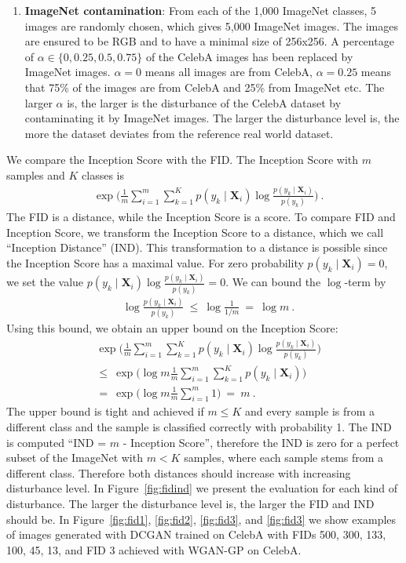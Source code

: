 \documentclass{article}
\newcommand\BX{\bm{X}}
\renewcommand{\leq}{\leqslant}
\begin{document}
\begin{enumerate}
\item {\bf ImageNet contamination}: From each of the 1,000 ImageNet classes,
5 images are randomly chosen, which gives 5,000 ImageNet images.
The images are ensured to be RGB and to have a minimal size of 256x256.
A percentage of $\alpha \in \{0,0.25,0.5,0.75\}$ of the
CelebA images has been replaced by ImageNet images.
$\alpha =0$ means all images are from CelebA, $\alpha=0.25$ means that
75\% of the images are from CelebA and 25\% from ImageNet etc.
The larger $\alpha$ is, the larger is the disturbance of the CelebA dataset
by contaminating it by ImageNet images.
The larger the disturbance level is, the more the dataset
deviates from the reference real world dataset.
\end{enumerate}


We compare the Inception Score \cite{Salimans:16} with the FID.
The Inception Score with $m$ samples and $K$ classes is
\begin{align}
&\exp \big( \frac{1}{m} \sum_{i=1}^{m} \sum_{k=1}^{K} p(y_k\mid \BX_i)
  \log \frac{p(y_k\mid \BX_i)}{p(y_k)} \big) \ .
\end{align}
The FID is a distance, while the Inception Score is a score.
To compare FID and Inception Score,
we transform the Inception Score to a distance,
which we call ``Inception Distance'' (IND).
This transformation to a distance
is possible since the Inception Score has a
maximal value.
For zero probability $p(y_k\mid \BX_i)=0$,
we set the value $p(y_k\mid \BX_i)
  \log \frac{p(y_k\mid \BX_i)}{p(y_k)}=0$.
We can bound the $\log$-term by
\begin{align}
&\log \frac{p(y_k\mid \BX_i)}{p(y_k)} \ \leq \  \log \frac{1}{1/m} \
  = \ \log m \ .
\end{align}
Using this bound, we obtain an upper bound on the Inception Score:
\begin{align}
&\exp \big( \frac{1}{m} \sum_{i=1}^{m} \sum_{k=1}^{K} p(y_k\mid \BX_i)
  \log \frac{p(y_k\mid \BX_i)}{p(y_k)} \big) \\
&\leq \ \exp \big( \log m \frac{1}{m} \sum_{i=1}^{m} \sum_{k=1}^{K} p(y_k\mid \BX_i) \big) \\
&= \ \exp \big( \log m \frac{1}{m} \sum_{i=1}^{m} 1 \big) \ = \ m \ .
\end{align}
The upper bound is tight and achieved if $m \leq K$ and every sample is from a
different class and the sample is classified correctly with
probability 1.
The IND is computed ``IND = $m$ - Inception Score'', therefore the IND is
zero for a perfect subset of the ImageNet with $m<K$ samples,
where each sample stems from a different class.
Therefore both distances should increase with increasing disturbance level.
In Figure~\ref{fig:fidind} we present the evaluation
for each kind of disturbance. The larger the disturbance level is, the larger
the FID and IND  should be. In Figure~\ref{fig:fid1},
\ref{fig:fid2}, \ref{fig:fid3}, and \ref{fig:fid3} we show examples of images
generated with DCGAN trained on CelebA with FIDs 500, 300, 133, 100, 45, 13, and FID 3 achieved with
WGAN-GP on CelebA.
\end{document}
